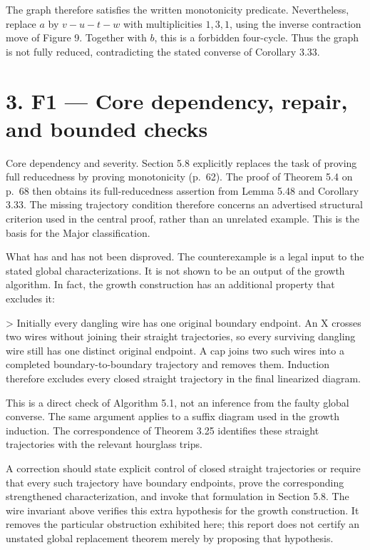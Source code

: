 \documentclass[10pt]{article}
\begin{document}
The graph therefore satisfies the written monotonicity predicate. Nevertheless, replace \(a\) by \(v-u-t-w\) with multiplicities \(1,3,1\), using the inverse contraction move of Figure 9. Together with \(b\), this is a forbidden four-cycle. Thus the graph is not fully reduced, contradicting the stated converse of Corollary 3.33.\par
\section*{3. F1 — Core dependency, repair, and bounded checks}
Core dependency and severity. Section 5.8 explicitly replaces the task of proving full reducedness by proving monotonicity (p. 62). The proof of Theorem 5.4 on p. 68 then obtains its full-reducedness assertion from Lemma 5.48 and Corollary 3.33. The missing trajectory condition therefore concerns an advertised structural criterion used in the central proof, rather than an unrelated example. This is the basis for the Major classification.\par
What has and has not been disproved. The counterexample is a legal input to the stated global characterizations. It is not shown to be an output of the growth algorithm. In fact, the growth construction has an additional property that excludes it:\par
> Initially every dangling wire has one original boundary endpoint. An X crosses two wires without joining their straight trajectories, so every surviving dangling wire still has one distinct original endpoint. A cap joins two such wires into a completed boundary-to-boundary trajectory and removes them. Induction therefore excludes every closed straight trajectory in the final linearized diagram.\par
This is a direct check of Algorithm 5.1, not an inference from the faulty global converse. The same argument applies to a suffix diagram used in the growth induction. The correspondence of Theorem 3.25 identifies these straight trajectories with the relevant hourglass trips.\par
A correction should state explicit control of closed straight trajectories or require that every such trajectory have boundary endpoints, prove the corresponding strengthened characterization, and invoke that formulation in Section 5.8. The wire invariant above verifies this extra hypothesis for the growth construction. It removes the particular obstruction exhibited here; this report does not certify an unstated global replacement theorem merely by proposing that hypothesis.\par
\end{document}
